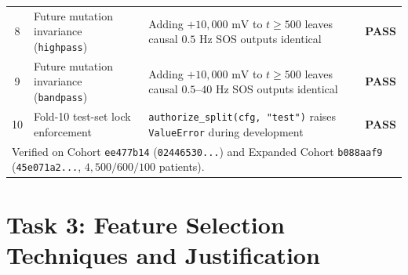 \documentclass[11pt,a4paper]{article}
\begin{document}
\begin{table}[H]
{\begin{tabular}{clll}
8 & Future mutation invariance (\texttt{highpass}) & Adding $+10{,}000\text{ mV}$ to $t \ge 500$ leaves causal $0.5\text{ Hz}$ SOS outputs identical & \textcolor{passgreen}{\textbf{PASS}} \\
9 & Future mutation invariance (\texttt{bandpass}) & Adding $+10{,}000\text{ mV}$ to $t \ge 500$ leaves causal $0.5\text{--}40\text{ Hz}$ SOS outputs identical & \textcolor{passgreen}{\textbf{PASS}} \\
10 & Fold-10 test-set lock enforcement & \texttt{authorize\_split(cfg, "test")} raises \texttt{ValueError} during development & \textcolor{passgreen}{\textbf{PASS}} \\
\bottomrule
\multicolumn{4}{l}{\footnotesize Verified on Cohort \texttt{ee477b14} (\texttt{02446530...}) and Expanded Cohort \texttt{b088aaf9} (\texttt{45e071a2...}, $4{,}500/600/100$ patients).}
\end{tabular}}
\end{table}

\section{Task 3: Feature Selection Techniques and Justification}
\label{sec:feature_selection}
\end{document}
